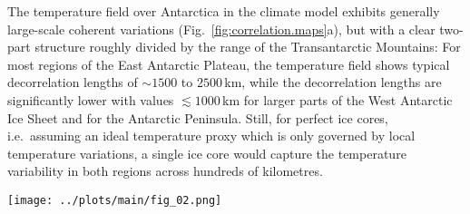 \documentclass[cp, manuscript]{copernicus}
\begin{document}
The temperature field over Antarctica in the climate model exhibits generally
large-scale coherent variations (Fig.~\ref{fig:correlation.maps}a), but with a
clear two-part structure roughly divided by the range of the Transantarctic
Mountains: For most regions of the East Antarctic Plateau, the temperature field
shows typical decorrelation lengths of $\sim1500$ to $2500$\,km, while the
decorrelation lengths are significantly lower with values $\lesssim1000$\,km for
larger parts of the West Antarctic Ice Sheet and for the Antarctic Peninsula.
Still, for perfect ice cores, i.e.\ assuming an ideal temperature proxy which is
only governed by local temperature variations, a single ice core would capture
the temperature variability in both regions across hundreds of kilometres.

\begin{figure*}[t]%
\centering
\texttt{[image: ../plots/main/fig\_02.png]}
\caption{%
  Temperature decorrelation lengths and temperature--isotope
  relationship. (\textbf{a}) The temperature decorrelation lengths ($\tau$, in
  km) for each Antarctic model grid cell estimated by fitting an exponential
  model to the correlation--distance relationship (cf. Eq.~\ref{eq:t2m.decorr})
  obtained from correlating the local annual near-surface $T_{2\mathrm{m}}$
  time series with the respective temperature time series from all other grid
  cells. Note that only continental grid cells are used for the fit.
  (\textbf{b}) The local correlation between the annual near-surface temperature
  ($T_{2\mathrm{m}}$) and precipitation-weighted oxygen isotope composition
  ($\delta^{18}\mathrm{O}^{\mathrm{(pw)}}$) time series for each Antarctic model
  grid cell.}
\label{fig:correlation.maps}%
\end{figure*}%
\end{document}

